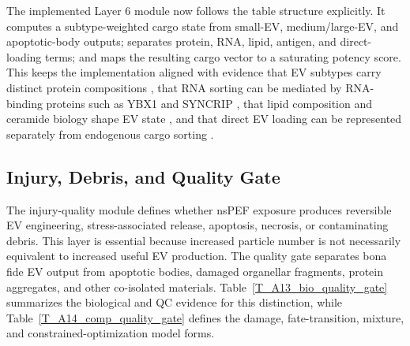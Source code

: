 \documentclass[Afour,sagev,times]{sagej}
\begin{document}
The implemented Layer 6 module now follows the table structure explicitly. It computes a subtype-weighted cargo state from small-EV, medium/large-EV, and apoptotic-body outputs; separates protein, RNA, lipid, antigen, and direct-loading terms; and maps the resulting cargo vector to a saturating potency score. This keeps the implementation aligned with evidence that EV subtypes carry distinct protein compositions \cite{jeppesen2019reassessment,kugeratski2021quantitative}, that RNA sorting can be mediated by RNA-binding proteins such as YBX1 and SYNCRIP \cite{shurtleff2016ybox,liu2021selective,santangelo2016syncrip}, that lipid composition and ceramide biology shape EV state \cite{skotland2023lipids}, and that direct EV loading can be represented separately from endogenous cargo sorting \cite{fuhrmann2015active,didiot2018optimized}.

\subsection*{Injury, Debris, and Quality Gate}

The injury-quality module defines whether nsPEF exposure produces reversible EV engineering, stress-associated release, apoptosis, necrosis, or contaminating debris. This layer is essential because increased particle number is not necessarily equivalent to increased useful EV production. The quality gate separates bona fide EV output from apoptotic bodies, damaged organellar fragments, protein aggregates, and other co-isolated materials. Table~\ref{T_A13_bio_quality_gate} summarizes the biological and QC evidence for this distinction, while Table~\ref{T_A14_comp_quality_gate} defines the damage, fate-transition, mixture, and constrained-optimization model forms.
\end{document}
